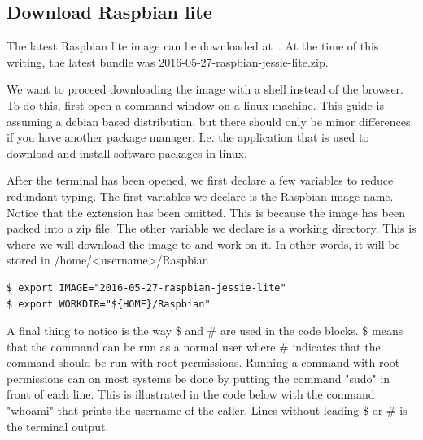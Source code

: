 \subsection{Download Raspbian lite}

The latest Raspbian lite image can be downloaded at~\cite{raspbian}.
At the time of this writing, the latest bundle was
2016-05-27-raspbian-jessie-lite.zip.

We want to proceed downloading the image with a shell instead of the browser.
To do this, first open a command window on a linux machine. This guide is
assuming a debian based distribution, but there should only be minor differences
if you have another package manager. I.e. the application that is used to
download and install software packages in linux.

After the terminal has been opened, we first declare a few variables to reduce
redundant typing. The first variables we declare is the Raspbian image name.
Notice that the extension has been omitted. This is because the image has been
packed into a zip file.
The other variable we declare is a working directory. This is where we will
download the image to and work on it. In other words, it will be stored in
/home/<username>/Raspbian


\begin{lstlisting}[]
$ export IMAGE="2016-05-27-raspbian-jessie-lite"
$ export WORKDIR="${HOME}/Raspbian"
\end{lstlisting}
\FloatBarrier
\vspace{-5mm}

A final thing to notice is the way \$ and \# are used in the code blocks. \$
means that the command can be run as a normal user where \# indicates that the
command should be run with root permissions.
Running a command with root permissions can on most systems be done by putting
the command "sudo" in front of each line. This is illustrated in the code below
with the command "whoami" that prints the username of the caller. Lines without
leading \$ or \# is the terminal output.

